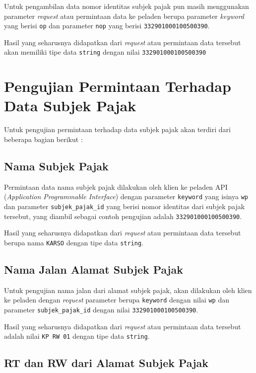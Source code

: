 Untuk pengambilan data nomor identitas subjek pajak pun masih menggunakan parameter \textit{request} atau permintaan data ke peladen berupa parameter \textit{keyword} yang berisi \texttt{op} dan parameter \texttt{nop} yang berisi \texttt{332901000100500390}.

Hasil yang seharusnya didapatkan dari \textit{request} atau permintaan data tersebut akan memiliki tipe data \texttt{string} dengan nilai \texttt{332901000100500390}

\section{Pengujian Permintaan Terhadap Data Subjek Pajak}

Untuk pengujian permintaan terhadap data subjek pajak akan terdiri dari beberapa bagian berikut :

\subsection{Nama Subjek Pajak}

Permintaan data nama subjek pajak dilakukan oleh klien ke peladen API (\textit{Application Programmable Interface}) dengan parameter \texttt{keyword} yang isinya \texttt{wp} dan parameter \texttt{subjek\_pajak\_id} yang berisi nomor identitas dari subjek pajak tersebut, yang diambil sebagai contoh pengujian adalah \texttt{332901000100500390}.

Hasil yang seharusnya didapatkan dari \textit{request} atau permintaan data tersebut berupa nama \texttt{KARSO} dengan tipe data \texttt{string}.

\subsection{Nama Jalan Alamat Subjek Pajak}

Untuk pengujian nama jalan dari alamat subjek pajak, akan dilakukan oleh klien ke peladen dengan \textit{request} parameter berupa \texttt{keyword} dengan nilai \texttt{wp} dan parameter \texttt{subjek\_pajak\_id} dengan nilai \texttt{332901000100500390}.

Hasil yang seharusnya didapatkan dari \textit{request} atau permintaan data tersebut adalah nilai \texttt{KP RW 01} dengan tipe data \texttt{string}.

\subsection{RT dan RW dari Alamat Subjek Pajak}

